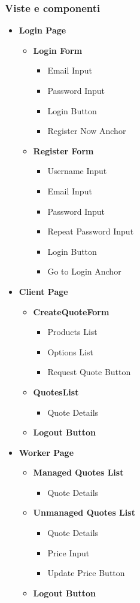 \documentclass[a4paper, 12pt]{article}
\begin{document}
\subsubsection{Viste e componenti}
\begin{itemize}
	\item \textbf{Login Page}
	\begin{itemize}
		\item \textbf{Login Form}
		\begin{itemize}
			\item Email Input
			\item Password Input
			\item Login Button
			\item Register Now Anchor
		\end{itemize}
		\item \textbf{Register Form}
		\begin{itemize}
			\item Username Input
			\item Email Input
			\item Password Input
			\item Repeat Password Input
			\item Login Button
			\item Go to Login Anchor
		\end{itemize}
	\end{itemize}
	\item \textbf{Client Page}
	\begin{itemize}
		\item \textbf{CreateQuoteForm}
		\begin{itemize}
			\item Products List
			\item Options List
			\item Request Quote Button
		\end{itemize}
		\item \textbf{QuotesList}
		\begin{itemize}
			\item Quote Details
		\end{itemize}
		\item \textbf{Logout Button}
	\end{itemize}
	\item \textbf{Worker Page}
	\begin{itemize}
	\item \textbf{Managed Quotes List}
	\begin{itemize}
		\item Quote Details
	\end{itemize}
	\item \textbf{Unmanaged Quotes List}
	\begin{itemize}
		\item Quote Details
		\item Price Input
		\item Update Price Button
	\end{itemize}
		\item \textbf{Logout Button}
	\end{itemize}
\end{itemize}
\end{document}
